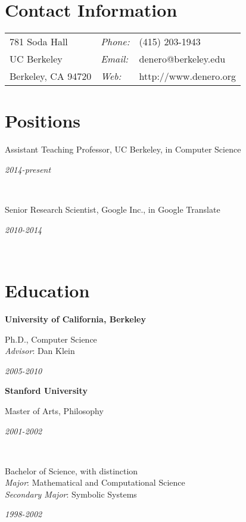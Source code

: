 \documentclass[margin,line]{res}
\newcommand{\dated}[2]{\parbox[t]{4.4in}{#1} \hspace{0.4in}
											 \parbox[t]{1in}{ {\it #2 } } }
\begin{document}

\begin{resume}

\section{\sc Contact Information}
\vspace{.05in}
\begin{tabular}{@{}p{2in}lp{4in}}
781 Soda Hall         & {\it Phone:} & (415) 203-1943        \\
UC Berkeley           & {\it Email:} & denero@berkeley.edu   \\
Berkeley, CA  94720   & {\it Web:}   & http://www.denero.org \\
\end{tabular}

\section{\sc Positions}

	\dated{Assistant Teaching Professor, UC Berkeley, in Computer Science}
	{ 2014-present } \\

	\dated{Senior Research Scientist, Google Inc., in Google Translate}
	{ 2010-2014 } \\

\section{\sc Education}

	{\bf University of California, Berkeley} \\
	\dated{Ph.D., Computer Science \\
	\hspace*{1em} {\it Advisor}: Dan Klein}{ 2005-2010 }

	{\bf Stanford University} \\
	\dated{Master of Arts, Philosophy\vspace{0.12in}}{ 2001-2002 } \\
	\dated{Bachelor of Science, with distinction \\
	\hspace*{1em} {\it Major}: Mathematical and Computational Science \\
	\hspace*{1em} {\it Secondary Major}: Symbolic Systems}{ 1998-2002 }


\end{resume}
\end{document}
